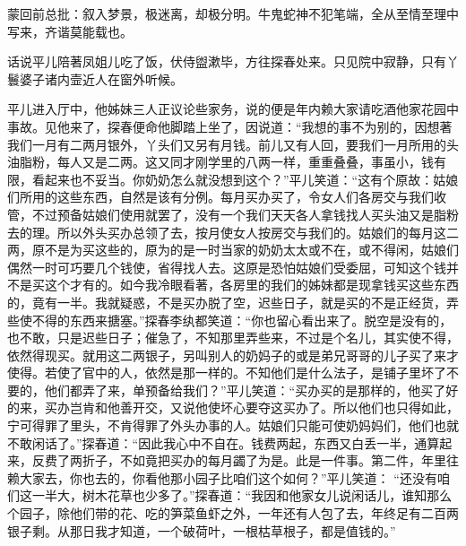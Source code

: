 \begin{parag}

    \begin{note}蒙回前总批：叙入梦景，极迷离，却极分明。牛鬼蛇神不犯笔端，全从至情至理中写来，齐谐莫能载也。\end{note}
\end{parag}

\begin{parag}

    话说平儿陪著凤姐儿吃了饭，伏侍盥漱毕，方往探春处来。只见院中寂静，只有丫鬟婆子诸内壸近人在窗外听候。
\end{parag}


\begin{parag}


    平儿进入厅中，他姊妹三人正议论些家务，说的便是年内赖大家请吃酒他家花园中事故。见他来了，探春便命他脚踏上坐了，因说道：“我想的事不为别的，因想著我们一月有二两月银外，丫头们又另有月钱。前儿又有人回，要我们一月所用的头油脂粉，每人又是二两。这又同才刚学里的八两一样，重重叠叠，事虽小，钱有限，看起来也不妥当。你奶奶怎么就没想到这个？”平儿笑道：“这有个原故：姑娘们所用的这些东西，自然是该有分例。每月买办买了，令女人们各房交与我们收管，不过预备姑娘们使用就罢了，没有一个我们天天各人拿钱找人买头油又是脂粉去的理。所以外头买办总领了去，按月使女人按房交与我们的。姑娘们的每月这二两，原不是为买这些的，原为的是一时当家的奶奶太太或不在，或不得闲，姑娘们偶然一时可巧要几个钱使，省得找人去。这原是恐怕姑娘们受委屈，可知这个钱并不是买这个才有的。如今我冷眼看著，各房里的我们的姊妹都是现拿钱买这些东西的，竟有一半。我就疑惑，不是买办脱了空，迟些日子，就是买的不是正经货，弄些使不得的东西来搪塞。”探春李纨都笑道：“你也留心看出来了。脱空是没有的，也不敢，只是迟些日子；催急了，不知那里弄些来，不过是个名儿，其实使不得，依然得现买。就用这二两银子，另叫别人的奶妈子的或是弟兄哥哥的儿子买了来才使得。若使了官中的人，依然是那一样的。不知他们是什么法子，是铺子里坏了不要的，他们都弄了来，单预备给我们？”平儿笑道：“买办买的是那样的，他买了好的来，买办岂肯和他善开交，又说他使坏心要夺这买办了。所以他们也只得如此，宁可得罪了里头，不肯得罪了外头办事的人。姑娘们只能可使奶妈妈们，他们也就不敢闲话了。”探春道：“因此我心中不自在。钱费两起，东西又白丢一半，通算起来，反费了两折子，不如竟把买办的每月蠲了为是。此是一件事。第二件，年里往赖大家去，你也去的，你看他那小园子比咱们这个如何？”平儿笑道： “还没有咱们这一半大，树木花草也少多了。”探春道：“我因和他家女儿说闲话儿，谁知那么个园子，除他们带的花、吃的笋菜鱼虾之外，一年还有人包了去，年终足有二百两银子剩。从那日我才知道，一个破荷叶，一根枯草根子，都是值钱的。”
\end{parag}


